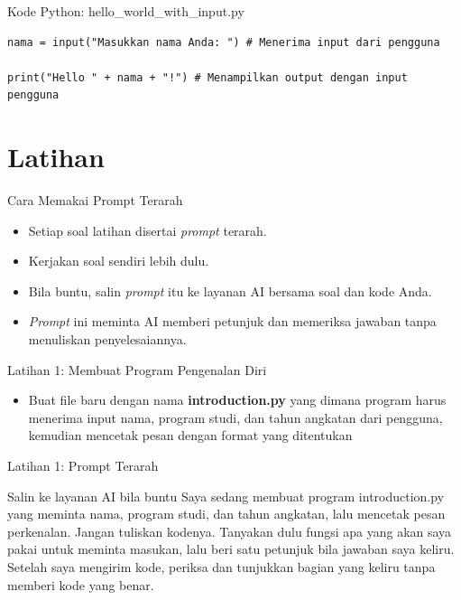 \documentclass[aspectratio=169, table]{beamer}
\begin{document}
\begin{frame}[fragile]{Kode Python: hello_world_with_input.py}
\begin{lstlisting}[style=PythonStyle]
nama = input("Masukkan nama Anda: ") # Menerima input dari pengguna

print("Hello " + nama + "!") # Menampilkan output dengan input pengguna
\end{lstlisting}
\end{frame}

\section{Latihan}
\begin{frame}{Cara Memakai Prompt Terarah}
\begin{itemize}
\item Setiap soal latihan disertai \textit{prompt} terarah.
\item Kerjakan soal sendiri lebih dulu.
\item Bila buntu, salin \textit{prompt} itu ke layanan AI bersama soal dan kode Anda.
\item \textit{Prompt} ini meminta AI memberi petunjuk dan memeriksa jawaban tanpa menuliskan penyelesaiannya.
\end{itemize}
\end{frame}

\begin{frame}[fragile]{Latihan 1: Membuat Program Pengenalan Diri}
\begin{itemize}
\item Buat file baru dengan nama \textbf{introduction.py} yang dimana program harus menerima input nama, program studi, dan tahun angkatan dari pengguna, kemudian mencetak pesan dengan format yang ditentukan
\end{itemize}
\end{frame}

\begin{frame}{Latihan 1: Prompt Terarah}
\begin{block}{Salin ke layanan AI bila buntu}
\small Saya sedang membuat program introduction.py yang meminta nama, program studi, dan tahun angkatan, lalu mencetak pesan perkenalan. Jangan tuliskan kodenya. Tanyakan dulu fungsi apa yang akan saya pakai untuk meminta masukan, lalu beri satu petunjuk bila jawaban saya keliru. Setelah saya mengirim kode, periksa dan tunjukkan bagian yang keliru tanpa memberi kode yang benar.
\end{block}
\end{frame}
\end{document}
